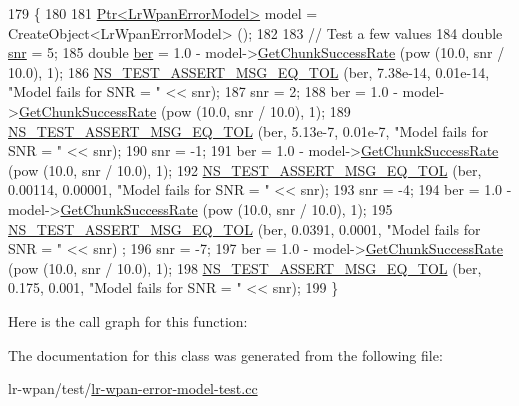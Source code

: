 \begin{DoxyCode}
179 \{
180 
181   \hyperlink{classns3_1_1Ptr}{Ptr<LrWpanErrorModel>} model = CreateObject<LrWpanErrorModel> ();
182 
183   \textcolor{comment}{// Test a few values}
184   \textcolor{keywordtype}{double} \hyperlink{lte__amc_8m_a7543c5e4e80c828b652e0c63e4a6de70}{snr} = 5;
185   \textcolor{keywordtype}{double} \hyperlink{lte__cqi__generation_8m_a197619a3539acfc577325d6e41b6ce95}{ber} = 1.0 - model->\hyperlink{classns3_1_1LrWpanErrorModel_a6a17b1622b7fc3582b9608b94782384b}{GetChunkSuccessRate} (pow (10.0, snr / 10.0), 1);
186   \hyperlink{group__testing_ga9e7861b56b4e70db3b56044cb7a28e41}{NS\_TEST\_ASSERT\_MSG\_EQ\_TOL} (ber, 7.38e-14, 0.01e-14, \textcolor{stringliteral}{"Model fails for SNR = "} << 
      snr);
187   snr = 2;
188   ber = 1.0 - model->\hyperlink{classns3_1_1LrWpanErrorModel_a6a17b1622b7fc3582b9608b94782384b}{GetChunkSuccessRate} (pow (10.0, snr / 10.0), 1);
189   \hyperlink{group__testing_ga9e7861b56b4e70db3b56044cb7a28e41}{NS\_TEST\_ASSERT\_MSG\_EQ\_TOL} (ber, 5.13e-7, 0.01e-7, \textcolor{stringliteral}{"Model fails for SNR = "} << 
      snr);
190   snr = -1;
191   ber = 1.0 - model->\hyperlink{classns3_1_1LrWpanErrorModel_a6a17b1622b7fc3582b9608b94782384b}{GetChunkSuccessRate} (pow (10.0, snr / 10.0), 1);
192   \hyperlink{group__testing_ga9e7861b56b4e70db3b56044cb7a28e41}{NS\_TEST\_ASSERT\_MSG\_EQ\_TOL} (ber, 0.00114, 0.00001, \textcolor{stringliteral}{"Model fails for SNR = "} << 
      snr);
193   snr = -4;
194   ber = 1.0 - model->\hyperlink{classns3_1_1LrWpanErrorModel_a6a17b1622b7fc3582b9608b94782384b}{GetChunkSuccessRate} (pow (10.0, snr / 10.0), 1);
195   \hyperlink{group__testing_ga9e7861b56b4e70db3b56044cb7a28e41}{NS\_TEST\_ASSERT\_MSG\_EQ\_TOL} (ber, 0.0391, 0.0001, \textcolor{stringliteral}{"Model fails for SNR = "} << snr)
      ;
196   snr = -7;
197   ber = 1.0 - model->\hyperlink{classns3_1_1LrWpanErrorModel_a6a17b1622b7fc3582b9608b94782384b}{GetChunkSuccessRate} (pow (10.0, snr / 10.0), 1);
198   \hyperlink{group__testing_ga9e7861b56b4e70db3b56044cb7a28e41}{NS\_TEST\_ASSERT\_MSG\_EQ\_TOL} (ber, 0.175, 0.001, \textcolor{stringliteral}{"Model fails for SNR = "} << snr);
199 \}
\end{DoxyCode}


Here is the call graph for this function\+:




The documentation for this class was generated from the following file\+:\begin{DoxyCompactItemize}
\item 
lr-\/wpan/test/\hyperlink{lr-wpan-error-model-test_8cc}{lr-\/wpan-\/error-\/model-\/test.\+cc}\end{DoxyCompactItemize}
